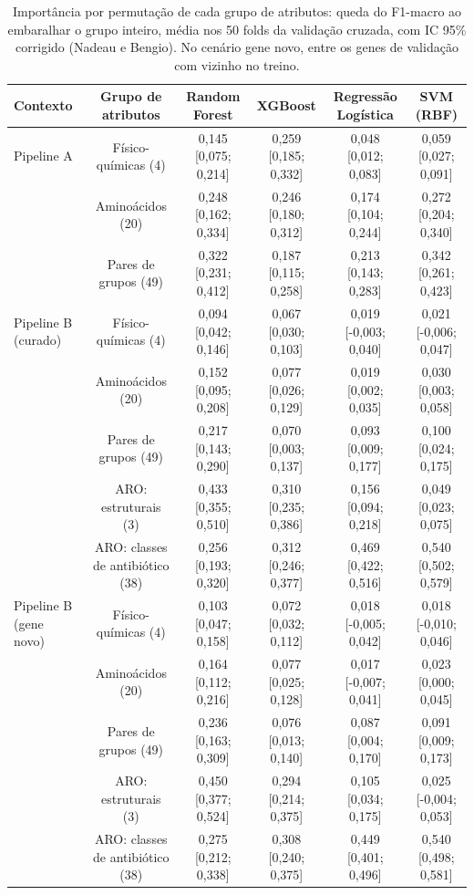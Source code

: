 \begin{table}[htbp]
  \centering
  \caption{Importância por permutação de cada grupo de atributos: queda do F1-macro ao embaralhar o grupo inteiro, média nos 50 folds da validação cruzada, com IC 95\% corrigido (Nadeau e Bengio). No cenário gene novo, entre os genes de validação com vizinho no treino.}
  \label{tab:importancia_grupos}
  \begin{tabular}{lccccc}
    \toprule
    Contexto & Grupo de atributos & Random Forest & XGBoost & Regressão Logística & SVM (RBF) \\
    \midrule
    Pipeline A & Físico-químicas (4) & 0,145 [0,075; 0,214] & 0,259 [0,185; 0,332] & 0,048 [0,012; 0,083] & 0,059 [0,027; 0,091] \\
     & Aminoácidos (20) & 0,248 [0,162; 0,334] & 0,246 [0,180; 0,312] & 0,174 [0,104; 0,244] & 0,272 [0,204; 0,340] \\
     & Pares de grupos (49) & 0,322 [0,231; 0,412] & 0,187 [0,115; 0,258] & 0,213 [0,143; 0,283] & 0,342 [0,261; 0,423] \\
    Pipeline B (curado) & Físico-químicas (4) & 0,094 [0,042; 0,146] & 0,067 [0,030; 0,103] & 0,019 [-0,003; 0,040] & 0,021 [-0,006; 0,047] \\
     & Aminoácidos (20) & 0,152 [0,095; 0,208] & 0,077 [0,026; 0,129] & 0,019 [0,002; 0,035] & 0,030 [0,003; 0,058] \\
     & Pares de grupos (49) & 0,217 [0,143; 0,290] & 0,070 [0,003; 0,137] & 0,093 [0,009; 0,177] & 0,100 [0,024; 0,175] \\
     & ARO: estruturais (3) & 0,433 [0,355; 0,510] & 0,310 [0,235; 0,386] & 0,156 [0,094; 0,218] & 0,049 [0,023; 0,075] \\
     & ARO: classes de antibiótico (38) & 0,256 [0,193; 0,320] & 0,312 [0,246; 0,377] & 0,469 [0,422; 0,516] & 0,540 [0,502; 0,579] \\
    Pipeline B (gene novo) & Físico-químicas (4) & 0,103 [0,047; 0,158] & 0,072 [0,032; 0,112] & 0,018 [-0,005; 0,042] & 0,018 [-0,010; 0,046] \\
     & Aminoácidos (20) & 0,164 [0,112; 0,216] & 0,077 [0,025; 0,128] & 0,017 [-0,007; 0,041] & 0,023 [0,000; 0,045] \\
     & Pares de grupos (49) & 0,236 [0,163; 0,309] & 0,076 [0,013; 0,140] & 0,087 [0,004; 0,170] & 0,091 [0,009; 0,173] \\
     & ARO: estruturais (3) & 0,450 [0,377; 0,524] & 0,294 [0,214; 0,375] & 0,105 [0,034; 0,175] & 0,025 [-0,004; 0,053] \\
     & ARO: classes de antibiótico (38) & 0,275 [0,212; 0,338] & 0,308 [0,240; 0,375] & 0,449 [0,401; 0,496] & 0,540 [0,498; 0,581] \\
    \bottomrule
  \end{tabular}
\end{table}
